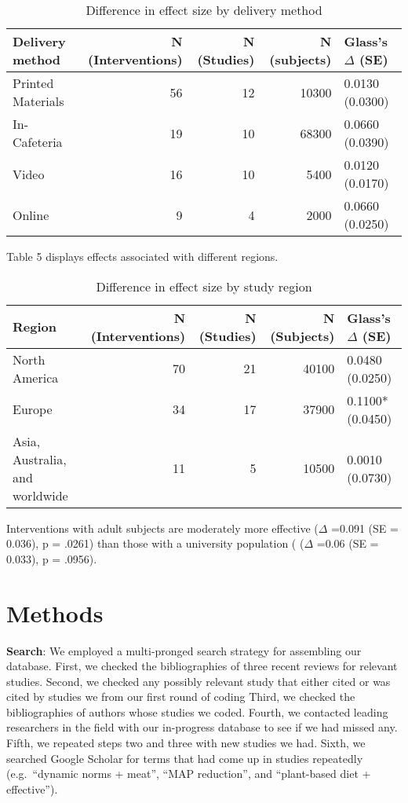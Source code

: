 \documentclass[sn-nature,pdflatex]{sn-jnl}
\begin{document}
\begin{table}[!h]
\centering
\caption{\label{tab:table_four}Difference in effect size by delivery method}
\centering
\begin{tabular}[t]{lrrrl}
\toprule
Delivery method & N (Interventions) & N (Studies) & N (subjects) & Glass's $\Delta$ (SE)\\
\midrule
Printed Materials & 56 & 12 & 10300 & 0.0130 (0.0300)\\
In-Cafeteria & 19 & 10 & 68300 & 0.0660 (0.0390)\\
Video & 16 & 10 & 5400 & 0.0120 (0.0170)\\
Online & 9 & 4 & 2000 & 0.0660 (0.0250)\\
\bottomrule
\end{tabular}
\end{table}

Table 5 displays effects associated with different regions.

\begin{table}[!h]
\centering
\caption{\label{tab:table_five}Difference in effect size by study region}
\centering
\begin{tabular}[t]{lrrrl}
\toprule
Region & N (Interventions) & N (Studies) & N (Subjects) & Glass's $\Delta$ (SE)\\
\midrule
North America & 70 & 21 & 40100 & 0.0480 (0.0250)\\
Europe & 34 & 17 & 37900 & 0.1100* (0.0450)\\
Asia, Australia, and worldwide & 11 & 5 & 10500 & 0.0010 (0.0730)\\
\bottomrule
\end{tabular}
\end{table}

Interventions with adult subjects are moderately more effective
(\(\Delta\) =0.091 (SE = 0.036), p = .0261) than those with a university
population ( (\(\Delta\) =0.06 (SE = 0.033), p = .0956).

\section{Methods}\label{sec3}

\textbf{Search}: We employed a multi-pronged search strategy for
assembling our database. First, we checked the bibliographies of three
recent reviews
\citep{mathur2021meta, bianchi2018conscious, bianchi2018restructuring}
for relevant studies. Second, we checked any possibly relevant study
that either cited or was cited by studies we from our first round of
coding Third, we checked the bibliographies of authors whose studies we
coded. Fourth, we contacted leading researchers in the field with our
in-progress database to see if we had missed any. Fifth, we repeated
steps two and three with new studies we had. Sixth, we searched Google
Scholar for terms that had come up in studies repeatedly (e.g.~``dynamic
norms + meat'', ``MAP reduction'', and ``plant-based diet +
effective'').
\end{document}
